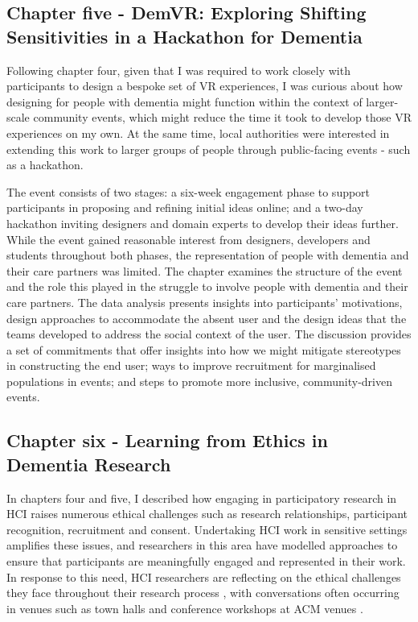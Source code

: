\subsection{Chapter five - DemVR: Exploring Shifting Sensitivities in a Hackathon for Dementia}
\label{Intro:ChapterFive}
Following chapter four, given that I was required to work closely with participants to design a bespoke set of VR experiences, I was curious about how designing for people with dementia might function within the context of larger-scale community events, which might reduce the time it took to develop those VR experiences on my own. At the same time, local authorities were interested in extending this work to larger groups of people through public-facing events - such as a hackathon. 

The event consists of two stages: a six-week engagement phase to support participants in proposing and refining initial ideas online; and a two-day hackathon inviting designers and domain experts to develop their ideas further. While the event gained reasonable interest from designers, developers and students throughout both phases, the representation of people with dementia and their care partners was limited. The chapter examines the structure of the event and the role this played in the struggle to involve people with dementia and their care partners. The data analysis presents insights into participants’ motivations, design approaches to accommodate the absent user and the design ideas that the teams developed to address the social context of the user. The discussion provides a set of commitments that offer insights into how we might mitigate stereotypes in constructing the end user; ways to improve recruitment for marginalised populations in events; and steps to promote more inclusive, community-driven events. 

\subsection{Chapter six - Learning from Ethics in Dementia Research}
\label{Intro:ChapterSix}
In chapters four and five, I described how engaging in participatory research in HCI raises numerous ethical challenges such as research relationships, participant recognition, recruitment and consent. Undertaking HCI work in sensitive settings amplifies these issues, and researchers in this area have modelled approaches to ensure that participants are meaningfully engaged and represented in their work. In response to this need, HCI researchers are reflecting on the ethical challenges they face throughout their research process \citep{vines_designing_2013}, with conversations often occurring in venues such as town halls \citep{munteanu_sigchi_2019,bruckman_cscw_2017} and conference workshops at ACM venues \citep{davis_ethical_2015,waycott_challenge_2015}.

